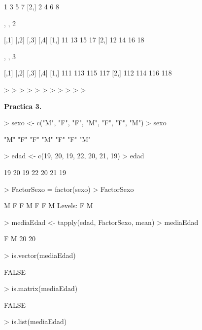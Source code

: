 \documentclass{article}
\begin{document}
\begin{Schunk}
\begin{Soutput}
     [,1] [,2] [,3] [,4]
[1,]    1    3    5    7
[2,]    2    4    6    8

, , 2

     [,1] [,2] [,3] [,4]
[1,]   11   13   15   17
[2,]   12   14   16   18

, , 3

     [,1] [,2] [,3] [,4]
[1,]  111  113  115  117
[2,]  112  114  116  118
\end{Soutput}
\begin{Sinput}
> 
> 
> 
> 
> 
> 
> 
> 
> 
> 
> 
\end{Sinput}
\end{Schunk}

\textbf{Practica 3.}


\begin{Schunk}
\begin{Sinput}
> sexo <- c("M", "F", "F", "M", "F", "F", "M")
> sexo
\end{Sinput}
\begin{Soutput}
[1] "M" "F" "F" "M" "F" "F" "M"
\end{Soutput}
\begin{Sinput}
> edad <- c(19, 20, 19, 22, 20, 21, 19)
> edad
\end{Sinput}
\begin{Soutput}
[1] 19 20 19 22 20 21 19
\end{Soutput}
\begin{Sinput}
> FactorSexo = factor(sexo)
> FactorSexo
\end{Sinput}
\begin{Soutput}
[1] M F F M F F M
Levels: F M
\end{Soutput}
\begin{Sinput}
> mediaEdad <- tapply(edad, FactorSexo, mean) 
> mediaEdad
\end{Sinput}
\begin{Soutput}
 F  M 
20 20 
\end{Soutput}
\begin{Sinput}
> is.vector(mediaEdad)
\end{Sinput}
\begin{Soutput}
[1] FALSE
\end{Soutput}
\begin{Sinput}
> is.matrix(mediaEdad)
\end{Sinput}
\begin{Soutput}
[1] FALSE
\end{Soutput}
\begin{Sinput}
> is.list(mediaEdad)
\end{Sinput}

\end{Schunk}
\end{document}
